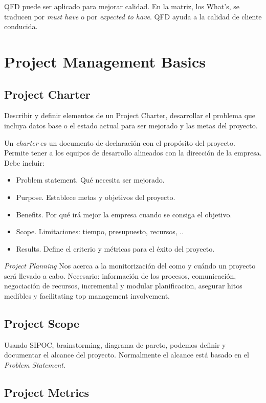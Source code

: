 \documentclass[]{article}
\begin{document}
QFD puede ser aplicado para mejorar calidad. En la matriz, los What's, se traducen por \textit{must have} o por \textit{expected to have}. QFD ayuda a la calidad de cliente conducida.

\section{Project Management Basics}

\subsection{Project Charter}

Describir y definir elementos de un Project Charter, desarrollar el problema que incluya datos base o el estado actual para ser mejorado y las metas del proyecto.

Un \textit{charter} es un documento de declaración con el propósito del proyecto.
Permite tener a los equipos de desarrollo alineados con la dirección de la empresa. Debe incluir: 

\begin{itemize}
	\item Problem statement. Qué necesita ser mejorado.
	\item Purpose. Establece metas y objetivos del proyecto.
	\item Benefits. Por qué irá mejor la empresa cuando se consiga el objetivo.
	\item Scope. Limitaciones: tiempo, presupuesto, recursos, ..
	\item Results. Define el criterio y métricas para el éxito del proyecto.
\end{itemize}

\textit{Project Planning} Nos acerca a la monitorización del como y cuándo un proyecto será llevado a cabo. Necesario: información de los procesos, comunicación, negociación de recursos, incremental y modular planificacion, asegurar hitos medibles y facilitating top management involvement.

\subsection{Project Scope}

Usando SIPOC, brainstorming, diagrama de pareto, podemos definir y documentar el alcance del proyecto. Normalmente el alcance está basado en el \textit{Problem Statement}.

\subsection{Project Metrics}
\end{document}

